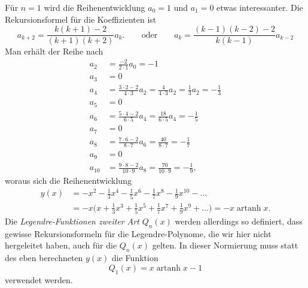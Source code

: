 Für $n=1$ wird die Reihenentwicklung $a_0=1$ und $a_1=0$ etwas
interessanter.
Die Rekursionsformel für die Koeffizienten ist
\[
a_{k+2}
=
\frac{k(k+1)-2}{(k+1)(k+2)} a_k.
\qquad\text{oder}\qquad
a_k
=
\frac{(k-1)(k-2)-2}{k(k-1)}
a_{k-2}
\]
Man erhält der Reihe nach
\begin{align*}
a_2 &= \frac{-2}{2\cdot 1} a_0 = -1
\\
a_3 &= 0
\\
a_4 &= \frac{3\cdot 2-2}{4\cdot 3} a_2 = \frac{4}{4\cdot 3}a_2 = \frac13a_2 = -\frac13
\\
a_5 &= 0
\\
a_6 &= \frac{5\cdot 4-2}{6\cdot 5}a_4 = \frac{18}{6\cdot 5}a_4 = -\frac15
\\
a_7 &= 0
\\
a_8 &= \frac{7\cdot 6-2}{8\cdot 7}a_6 = \frac{40}{8\cdot 7} = -\frac17
\\
a_9 &= 0
\\
a_{10} &= \frac{9\cdot 8-2}{10\cdot 9}a_8 = \frac{70}{10\cdot 9} = -\frac19,
\end{align*}
woraus sich die Reihenentwicklung
\begin{align*}
y(x)
&=
-x^2 -\frac13x^4 -\frac15x^6 - \frac17x^8 -\frac19x^{10}-\dots
\\
&=
-x\biggl(x+\frac13x^3 + \frac15x^5 + \frac17x^7 + \frac19x^9+\dots\biggr)
=
-x\operatorname{artanh}x.
\end{align*}
Die {\em Legendre-Funktionen zweiter Art} $Q_n(x)$  werden allerdings
so definiert, dass gewisse Rekursionsformeln für die Legendre-Polynome,
die wir hier nicht hergeleitet haben, auch für die $Q_n(x)$ gelten.
In dieser Normierung muss statt des eben berechneten $y(x)$ die Funktion
\[
Q_1(x) = x \operatorname{artanh}x-1
\]
verwendet werden.

